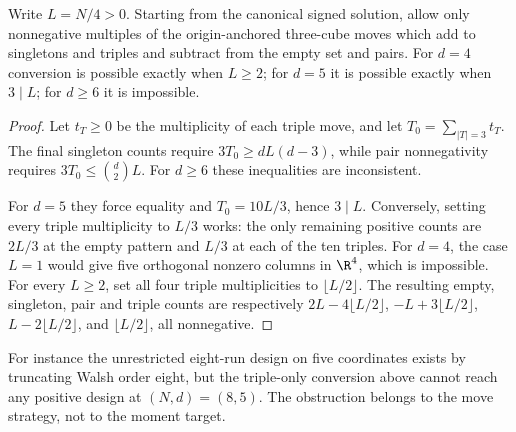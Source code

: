 \begin{proposition}
Write $L=N/4>0$. Starting from the canonical signed solution, allow only
nonnegative multiples of the origin-anchored three-cube moves which add
to singletons and triples and subtract from the empty set and pairs.
For $d=4$ conversion is possible exactly when $L\ge2$; for $d=5$ it is
possible exactly when $3\mid L$; for $d\ge6$ it is impossible.
\end{proposition}
\begin{proof}
Let $t_T\ge0$ be the multiplicity of each triple move, and let
$T_0=\sum_{|T|=3}t_T$. The final singleton counts require
$3T_0\ge dL(d-3)$, while pair nonnegativity requires
$3T_0\le\binom d2L$. For $d\ge6$ these inequalities are inconsistent.

For $d=5$ they force equality and $T_0=10L/3$, hence $3\mid L$.
Conversely, setting every triple multiplicity to $L/3$ works: the only
remaining positive counts are $2L/3$ at the empty pattern and $L/3$
at each of the ten triples. For $d=4$, the case $L=1$ would give five
orthogonal nonzero columns in $\R^4$, which is impossible. For every
$L\ge2$, set all four triple multiplicities to $\lfloor L/2\rfloor$.
The resulting empty, singleton, pair and triple counts are respectively
$2L-4\lfloor L/2\rfloor$, $-L+3\lfloor L/2\rfloor$,
$L-2\lfloor L/2\rfloor$, and $\lfloor L/2\rfloor$, all nonnegative.
\end{proof}
For instance the unrestricted eight-run design on five coordinates
exists by truncating Walsh order eight, but the triple-only conversion
above cannot reach any positive design at $(N,d)=(8,5)$. The obstruction
belongs to the move strategy, not to the moment target.

